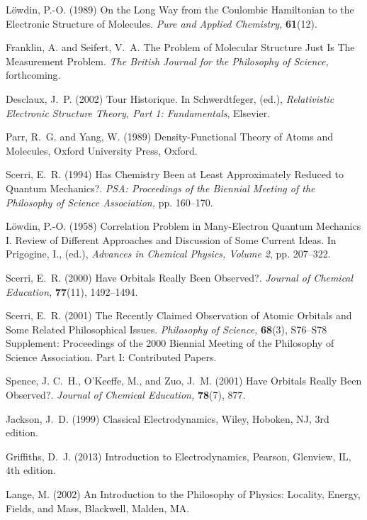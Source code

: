\documentclass[12pt,onecolumn,secnumarabic,amsmath,amssymb,balancelastpage,nofootinbib]{article}
\begin{document}
\begin{thebibliography}{100}
L\"{o}wdin, P.-O. (1989)
On the Long Way from the Coulombic Hamiltonian to the Electronic Structure of
  Molecules.
{\em Pure and Applied Chemistry,} {\bf 61}(12).

Franklin, A. and Seifert, V.~A.
The Problem of Molecular Structure Just Is The Measurement Problem.
{\em The British Journal for the Philosophy of Science,}
forthcoming.

Desclaux, J.~P. (2002)
Tour Historique.
In Schwerdtfeger, (ed.), \emph{Relativistic Electronic Structure Theory, Part
  1: Fundamentals},  Elsevier.

Parr, R.~G. and Yang, W. (1989)
Density-Functional Theory of Atoms and Molecules,
Oxford University Press, Oxford.

Scerri, E.~R. (1994)
Has Chemistry Been at Least Approximately Reduced to Quantum Mechanics?.
{\em PSA: Proceedings of the Biennial Meeting of the Philosophy of Science
  Association,} pp. 160--170.

L\"{o}wdin, P.-O. (1958)
Correlation Problem in Many-Electron Quantum Mechanics I. Review of Different
  Approaches and Discussion of Some Current Ideas.
In Prigogine, I., (ed.), \emph{Advances in Chemical Physics, Volume 2},  pp.
  207--322.

Scerri, E.~R. (2000)
Have Orbitals Really Been Observed?.
{\em Journal of Chemical Education,} {\bf 77}(11), 1492--1494.

Scerri, E.~R. (2001)
The Recently Claimed Observation of Atomic Orbitals and Some Related
  Philosophical Issues.
{\em Philosophy of Science,} {\bf 68}(3), S76--S78
Supplement: Proceedings of the 2000 Biennial Meeting of the Philosophy of
  Science Association. Part I: Contributed Papers.

Spence, J. C.~H., O'Keeffe, M., and Zuo, J.~M. (2001)
Have Orbitals Really Been Observed?.
{\em Journal of Chemical Education,} {\bf 78}(7), 877.

Jackson, J.~D. (1999)
Classical Electrodynamics,
Wiley, Hoboken, NJ, 3rd edition.

Griffiths, D.~J. (2013)
Introduction to Electrodynamics,
Pearson, Glenview, IL, 4th edition.

Lange, M. (2002)
An Introduction to the Philosophy of Physics: Locality, Energy, Fields, and
  Mass,
Blackwell, Malden, MA.


\end{thebibliography}
\end{document}
